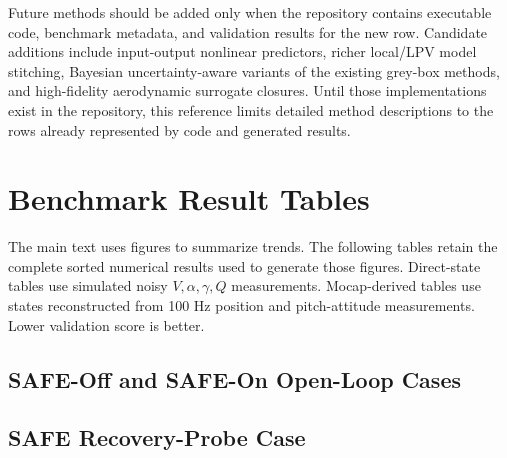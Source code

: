 \documentclass[11pt]{article}
\begin{document}
Future methods should be added only when the repository contains executable code, benchmark metadata, and validation results for the new row. Candidate additions include input-output nonlinear predictors, richer local/LPV model stitching, Bayesian uncertainty-aware variants of the existing grey-box methods, and high-fidelity aerodynamic surrogate closures. Until those implementations exist in the repository, this reference limits detailed method descriptions to the rows already represented by code and generated results.

\appendix
\section{Benchmark Result Tables}
\label{app:benchmark_tables}
The main text uses figures to summarize trends. The following tables retain the
complete sorted numerical results used to generate those figures. Direct-state
tables use simulated noisy $V,\alpha,\gamma,Q$ measurements. Mocap-derived
tables use states reconstructed from 100 Hz position and pitch-attitude
measurements. Lower validation score is better.

\subsection{SAFE-Off and SAFE-On Open-Loop Cases}

\subsection{SAFE Recovery-Probe Case}
\end{document}
